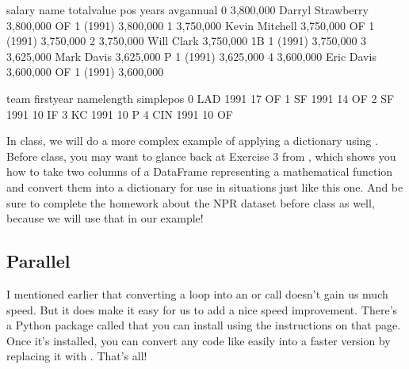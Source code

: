 \documentclass[letterpaper,10pt,english]{sphinxmanual}
\begin{document}
\begin{sphinxVerbatim}[commandchars=\\\{\}]
        salary               name  total\PYGZus{}value pos     years   avg\PYGZus{}annual  \PYGZbs{}
0  \PYGZdl{} 3,800,000  Darryl Strawberry  \PYGZdl{} 3,800,000  OF  1 (1991)  \PYGZdl{} 3,800,000   
1  \PYGZdl{} 3,750,000     Kevin Mitchell  \PYGZdl{} 3,750,000  OF  1 (1991)  \PYGZdl{} 3,750,000   
2  \PYGZdl{} 3,750,000         Will Clark  \PYGZdl{} 3,750,000  1B  1 (1991)  \PYGZdl{} 3,750,000   
3  \PYGZdl{} 3,625,000         Mark Davis  \PYGZdl{} 3,625,000   P  1 (1991)  \PYGZdl{} 3,625,000   
4  \PYGZdl{} 3,600,000         Eric Davis  \PYGZdl{} 3,600,000  OF  1 (1991)  \PYGZdl{} 3,600,000   

  team  first\PYGZus{}year  name\PYGZus{}length simple\PYGZus{}pos  
0  LAD        1991           17         OF  
1   SF        1991           14         OF  
2   SF        1991           10         IF  
3   KC        1991           10          P  
4  CIN        1991           10         OF  
\end{sphinxVerbatim}

In class, we will do a more complex example of applying a dictionary using .  Before class, you may want to glance back at Exercise 3 from {\hyperref[\detokenize{chapter-2-mathematical-foundations::doc}]{}}, which shows you how to take two columns of a DataFrame representing a mathematical function and convert them into a dictionary for use in situations just like this one.  And be sure to complete the homework about the NPR dataset before class as well, because we will use that in our example!


\subsection{Parallel }
\label{\detokenize{chapter-11-processing-rows:parallel-apply}}
I mentioned earlier that converting a loop into an  or  call doesn’t gain us much speed.  But it does make it easy for us to add a nice speed improvement.  There’s a Python package called  that you can install using the instructions on that page.  Once it’s installed, you can convert any code like  easily into a faster version by replacing it with .  That’s all!
\end{document}
